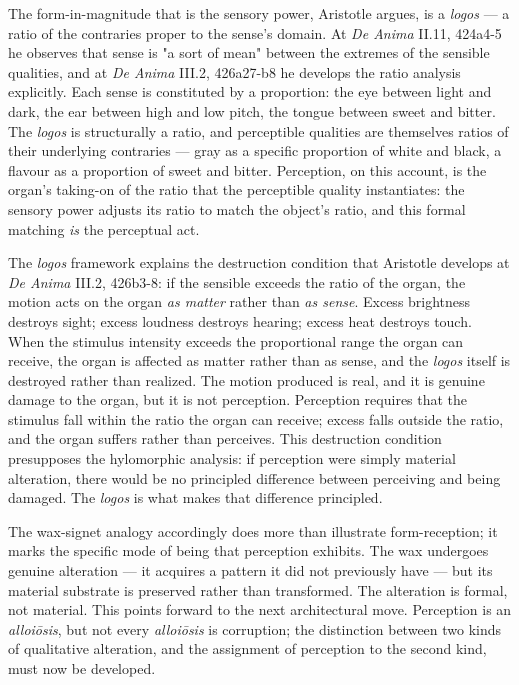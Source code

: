 \documentclass[12pt]{article}
\begin{document}
The form-in-magnitude that is the sensory power, Aristotle argues, is a \textit{logos} --- a ratio of the contraries proper to the sense's domain. At \textit{De Anima} II.11, 424a4-5 he observes that sense is "a sort of mean" between the extremes of the sensible qualities, and at \textit{De Anima} III.2, 426a27-b8 he develops the ratio analysis explicitly. Each sense is constituted by a proportion: the eye between light and dark, the ear between high and low pitch, the tongue between sweet and bitter. The \textit{logos} is structurally a ratio, and perceptible qualities are themselves ratios of their underlying contraries --- gray as a specific proportion of white and black, a flavour as a proportion of sweet and bitter. Perception, on this account, is the organ's taking-on of the ratio that the perceptible quality instantiates: the sensory power adjusts its ratio to match the object's ratio, and this formal matching \textit{is} the perceptual act.

The \textit{logos} framework explains the destruction condition that Aristotle develops at \textit{De Anima} III.2, 426b3-8: if the sensible exceeds the ratio of the organ, the motion acts on the organ \textit{as matter} rather than \textit{as sense}. Excess brightness destroys sight; excess loudness destroys hearing; excess heat destroys touch. When the stimulus intensity exceeds the proportional range the organ can receive, the organ is affected as matter rather than as sense, and the \textit{logos} itself is destroyed rather than realized. The motion produced is real, and it is genuine damage to the organ, but it is not perception. Perception requires that the stimulus fall within the ratio the organ can receive; excess falls outside the ratio, and the organ suffers rather than perceives. This destruction condition presupposes the hylomorphic analysis: if perception were simply material alteration, there would be no principled difference between perceiving and being damaged. The \textit{logos} is what makes that difference principled.

The wax-signet analogy accordingly does more than illustrate form-reception; it marks the specific mode of being that perception exhibits. The wax undergoes genuine alteration --- it acquires a pattern it did not previously have --- but its material substrate is preserved rather than transformed. The alteration is formal, not material. This points forward to the next architectural move. Perception is an \textit{alloiōsis}, but not every \textit{alloiōsis} is corruption; the distinction between two kinds of qualitative alteration, and the assignment of perception to the second kind, must now be developed.
\end{document}

